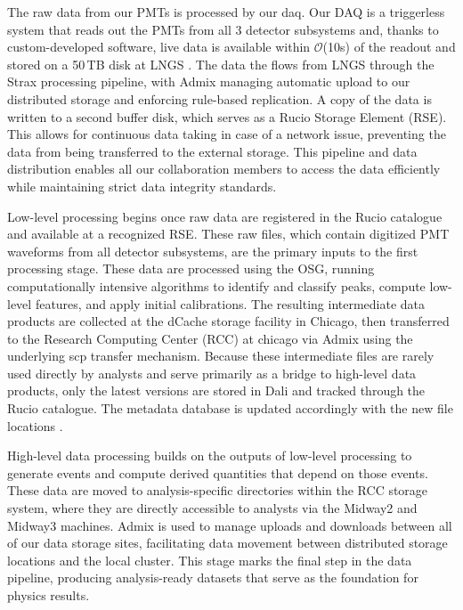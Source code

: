 The raw data from our PMTs is processed by our \acrfull{daq}. 
Our DAQ is a triggerless system that reads out the PMTs from all 3 detector subsystems and, thanks to custom-developed software, live data is available within $\mathcal{O}$(10s) of the readout 
and stored on a 50\,TB disk at LNGS \cite{tda_Aprile_2023}. The data the flows from LNGS through the Strax processing pipeline, with Admix managing automatic upload to our distributed storage and enforcing rule-based replication. A copy of the data is written to a second buffer disk, which serves as a Rucio Storage Element (RSE).
This allows for continuous data taking in case of a network issue, preventing the data from being transferred to the external storage. This pipeline and data distribution enables all our collaboration members to access the data efficiently while maintaining strict data integrity standards.


Low-level processing begins once raw data are registered in the Rucio catalogue and available at a recognized RSE. These raw files, which contain digitized PMT waveforms from all detector subsystems, are the primary inputs to the first processing stage. These data are processed using the OSG, running computationally intensive algorithms to identify and classify peaks, compute low-level features, and apply initial calibrations. The resulting intermediate data products are collected at the dCache storage facility in Chicago, then transferred to the Research Computing Center (RCC) at chicago via Admix using the underlying scp transfer mechanism. Because these intermediate files are rarely used directly by analysts and serve primarily as a bridge to high-level data products, only the latest versions are stored in Dali and tracked through the Rucio catalogue. The metadata database is updated accordingly with the new file locations \cite{Ahlin_2019}. 

High-level data processing builds on the outputs of low-level processing to generate events and compute derived quantities that depend on those events. These data are moved to analysis-specific directories within the RCC storage system, where they are directly accessible to analysts \cite{Ahlin_2019} via the Midway2 and Midway3 machines. Admix is used to manage uploads and downloads between all of our data storage sites, facilitating data movement between distributed storage locations and the local cluster. This stage marks the final step in the data pipeline, producing analysis-ready datasets that serve as the foundation for physics results.

